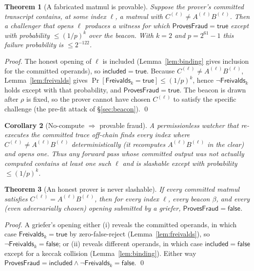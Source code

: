 \documentclass[11pt]{article}
\newtheorem{theorem}{Theorem}
\newtheorem{corollary}[theorem]{Corollary}
\begin{document}
\begin{theorem}[A fabricated matmul is provable]\label{thm:e2e}
Suppose the prover's committed transcript contains, at some index $\ell$, a matmul with
$C^{(\ell)}\neq A^{(\ell)}B^{(\ell)}$. Then a challenger that opens $\ell$ produces a witness for which
$\mathsf{ProvesFraud}=\mathsf{true}$ except with probability $\leq (1/p)^k$ over the beacon. With
$k=2$ and $p=2^{61}-1$ this failure probability is $\leq 2^{-122}$.
\end{theorem}
\begin{proof}
The honest opening of $\ell$ is included (Lemma~\ref{lem:binding} gives inclusion for the committed
operands), so $\mathsf{included}=\mathsf{true}$. Because $C^{(\ell)}\neq A^{(\ell)}B^{(\ell)}$,
Lemma~\ref{lem:freivalds} gives $\Pr[\mathsf{Freivalds}_k=\mathsf{true}]\leq (1/p)^k$, hence
$\neg\mathsf{Freivalds}_k$ holds except with that probability, and $\mathsf{ProvesFraud}=\mathsf{true}$.
The beacon is drawn after $\rho$ is fixed, so the prover cannot have chosen $C^{(\ell)}$ to satisfy
the specific challenge (the pre-fit attack of \S\ref{sec:beacon}). \qed
\end{proof}

\begin{corollary}[No-compute $\Rightarrow$ provable fraud]
A permissionless watcher that re-executes the committed trace off-chain finds every index where
$C^{(\ell)}\neq A^{(\ell)}B^{(\ell)}$ \emph{deterministically} (it recomputes $A^{(\ell)}B^{(\ell)}$ in
the clear) and opens one. Thus any forward pass whose committed output was not actually computed
contains at least one such $\ell$ and is slashable except with probability $\leq(1/p)^k$.
\end{corollary}

\begin{theorem}[An honest prover is never slashable]\label{thm:honest}
If every committed matmul satisfies $C^{(\ell)}=A^{(\ell)}B^{(\ell)}$, then for every index $\ell$,
every beacon $\beta$, and every (even adversarially chosen) opening submitted by a griefer,
$\mathsf{ProvesFraud}=\mathsf{false}$.
\end{theorem}
\begin{proof}
A griefer's opening either (i) reveals the committed operands, in which case
$\mathsf{Freivalds}_k=\mathsf{true}$ by zero-false-reject (Lemma~\ref{lem:freivalds}), so
$\neg\mathsf{Freivalds}_k=\mathsf{false}$; or (ii) reveals different operands, in which case
$\mathsf{included}=\mathsf{false}$ except for a keccak collision (Lemma~\ref{lem:binding}). Either way
$\mathsf{ProvesFraud}=\mathsf{included}\wedge\neg\mathsf{Freivalds}_k=\mathsf{false}$. \qed
\end{proof}
\end{document}
